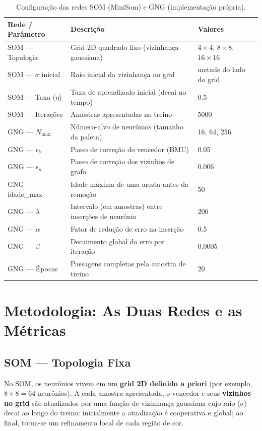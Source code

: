 \documentclass[11pt,a4paper]{article}
\begin{document}
\begin{table}[h]
\centering
\small
\caption{Configuração das redes SOM (MiniSom) e GNG (implementação própria).}
\label{tab:hiper}
\begin{tabularx}{\textwidth}{lXl}
\toprule
\textbf{Rede / Parâmetro} & \textbf{Descrição} & \textbf{Valores} \\
\midrule
SOM --- Topologia       & Grid 2D quadrado fixo (vizinhança gaussiana) & $4\times4$, $8\times8$, $16\times16$ \\
SOM --- $\sigma$ inicial & Raio inicial da vizinhança no grid & metade do lado do grid \\
SOM --- Taxa ($\eta$)    & Taxa de aprendizado inicial (decai no tempo) & 0.5 \\
SOM --- Iterações        & Amostras apresentadas no treino & 5000 \\
\midrule
GNG --- $N_{\max}$       & Número-alvo de neurônios (tamanho da paleta) & 16, 64, 256 \\
GNG --- $\epsilon_b$     & Passo de correção do vencedor (BMU) & 0.05 \\
GNG --- $\epsilon_n$     & Passo de correção dos vizinhos de grafo & 0.006 \\
GNG --- idade\_max       & Idade máxima de uma aresta antes da remoção & 50 \\
GNG --- $\lambda$        & Intervalo (em amostras) entre inserções de neurônio & 200 \\
GNG --- $\alpha$         & Fator de redução de erro na inserção & 0.5 \\
GNG --- $\beta$          & Decaimento global do erro por iteração & 0.0005 \\
GNG --- Épocas           & Passagens completas pela amostra de treino & 20 \\
\bottomrule
\end{tabularx}
\end{table}

\section{Metodologia: As Duas Redes e as Métricas}

\subsection{SOM --- Topologia Fixa}
No SOM, os neurônios vivem em um \textbf{grid 2D definido a priori} (por exemplo, $8\times8 = 64$ neurônios). A cada amostra apresentada, o vencedor e seus \textbf{vizinhos no grid} são atualizados por uma função de vizinhança gaussiana cujo raio ($\sigma$) decai ao longo do treino: inicialmente a atualização é cooperativa e global; ao final, torna-se um refinamento local de cada região de cor.
\end{document}
